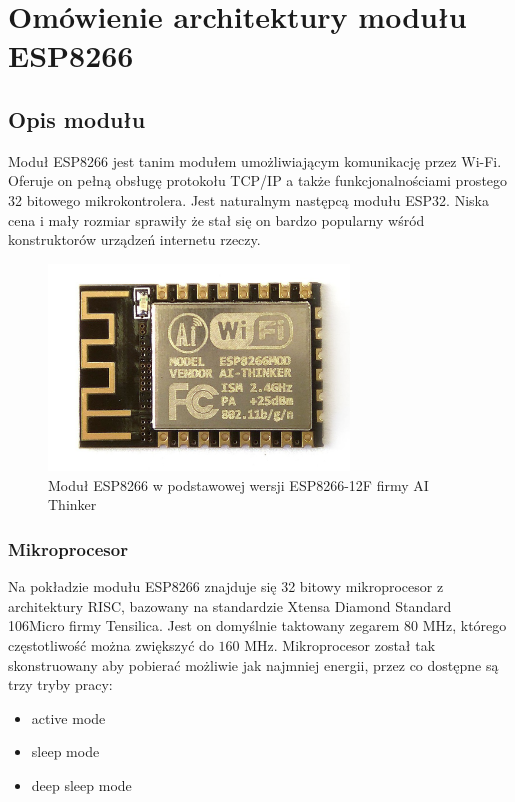 \chapter{Omówienie architektury modułu ESP8266}
\label{omowienie_arch}

\section{Opis modułu}
\label{opis_modulu}

Moduł ESP8266 jest tanim modułem umożliwiającym komunikację przez Wi-Fi.
Oferuje on pełną obsługę protokołu TCP/IP a także funkcjonalnościami prostego
32 bitowego mikrokontrolera. Jest naturalnym następcą modułu ESP32. Niska cena 
i mały rozmiar sprawiły że stał się on bardzo popularny wśród konstruktorów 
urządzeń internetu rzeczy.\\

\begin{figure}[H]
	\centering
    \includegraphics[width=8cm]{./images/esp8266.jpg}
    \caption{Moduł ESP8266 w podstawowej wersji ESP8266-12F firmy AI Thinker}
	\label{screen}
\end{figure}

\subsection{Mikroprocesor}
\label{mikroprocesor}

Na pokładzie modułu ESP8266 znajduje się 32 bitowy mikroprocesor z architektury RISC, 
bazowany na standardzie Xtensa Diamond Standard 106Micro firmy Tensilica.
Jest on domyślnie taktowany zegarem $\num{80}$ MHz, którego częstotliwość można 
zwiększyć do $\num{160}$ MHz. Mikroprocesor został tak skonstruowany aby pobierać 
możliwie jak najmniej energii, przez co dostępne są trzy tryby pracy:
\begin{itemize}
    \item active mode 
    \item sleep mode 
    \item deep sleep mode
\end{itemize}


